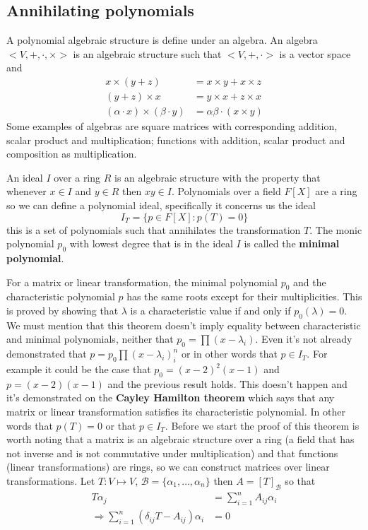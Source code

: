 \documentclass[../main.tex]{subfiles}
\begin{document}
\subsection{Annihilating polynomials}
A polynomial algebraic structure is define under an algebra. An algebra $<V,+,\cdot,\times>$ is an algebraic structure such that $<V,+,\cdot>$ is a vector space and 
\begin{align*}
    x\times(y+z)&=x\times y + x\times z\\
    (y+z)\times x &= y\times x + z\times x\\
    (\alpha\cdot x)\times(\beta\cdot y) &=\alpha\beta\cdot(x\times y)
\end{align*}
Some examples of algebras are square matrices with corresponding addition, scalar product and multiplication; functions with addition, scalar product and composition as multiplication.

An ideal $I$ over a ring $R$ is an algebraic structure with the property that whenever $x\in I$ and $y\in R$ then $xy\in I$. Polynomials over a field $F[X]$ are a ring so we can define a polynomial ideal, specifically it concerns us the ideal 
\begin{equation*}
    I_T = \{p\in F[X]: p(T)=0\}
\end{equation*}
this is a set of polynomials such that annihilates the transformation $T$. The monic polynomial $p_0$ with lowest degree that is in the ideal $I$ is called the \textbf{minimal polynomial}.

For a matrix or linear transformation, the minimal polynomial $p_0$ and the characteristic polynomial $p$ has the same roots except for their multiplicities. This is proved by showing that $\lambda$ is a characteristic value if and only if $p_0(\lambda)=0$. We must mention that this theorem doesn't imply equality between characteristic and minimal polynomials, neither that $p_0=\prod (x-\lambda_i)$. Even it's not already demonstrated that $p = p_0\prod (x-\lambda_i)^n_i$ or in other words that $p\in I_T$. For example it could be the case that $p_0 = (x-2)^2 (x-1)$ and $p = (x-2)(x-1)$ and the previous result holds. This doesn't happen and it's demonstrated on the \textbf{Cayley Hamilton theorem} which says that any matrix or linear transformation satisfies its characteristic polynomial. In other words that $p(T)=0$ or that $p\in I_T$.
Before we start the proof of this theorem is worth noting that a matrix is an algebraic structure over a ring (a field that has not inverse and is not commutative under multiplication) and that functions (linear transformations) are rings, so we can construct matrices over linear transformations.
Let $T:V\mapsto V$, $\mathcal{B}=\{\alpha_1,\dots,\alpha_n\}$ then $A = [T]_{\mathcal{B}}$ so that
\begin{align*}
    T\alpha_j 
    &= \sum_{i=1}^n A_{ij}\alpha_i\\
    \Longrightarrow \sum_{i=1}^n (\delta_{ij}T - A_{ij})\alpha_i &= 0\\
\end{align*}
\end{document}
